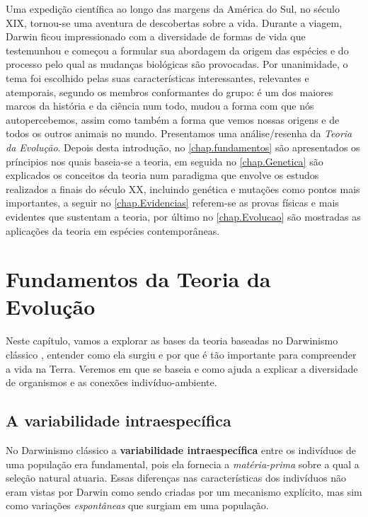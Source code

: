 \documentclass{report}
\begin{document}
Uma expedição científica ao longo das margens da América do Sul, no século XIX, tornou-se uma aventura de descobertas sobre a vida. Durante a viagem, Darwin ficou impressionado com a diversidade de formas de vida que testemunhou e começou a formular sua abordagem da origem das espécies e do processo pelo qual as mudanças biológicas são provocadas.
Por unanimidade, o tema foi escolhido pelas suas características interessantes, relevantes e atemporais, segundo os membros conformantes do grupo: é um dos maiores marcos da história e da ciência num todo, mudou a forma com que nós autopercebemos, assim como também a forma que vemos nossas origens e de todos os outros animais no mundo. 
Presentamos uma análise/resenha da \textit{Teoria da Evolução}. Depois desta introdução, no \autoref{chap.fundamentos} são apresentados os príncipios nos quais baseia-se a teoria, em seguida no \autoref{chap.Genetica} são explicados os conceitos da teoria num paradigma que envolve os estudos realizados a finais do século XX, incluindo genética e mutações como pontos mais importantes, a seguir no \autoref{chap.Evidencias} referem-se as provas físicas e mais evidentes que sustentam a teoria, por último no \autoref{chap.Evolucao} são mostradas as aplicações da teoria em espécies contemporâneas. 

\chapter{Fundamentos da Teoria da Evolução}\label{chap.fundamentos}

Neste capítulo, vamos a explorar as bases da teoria baseadas no Darwinismo clássico \cite{darwin.origin.2008}, entender como ela surgiu e por que é tão importante para compreender a vida na Terra. Veremos em que se baseia e como ajuda a explicar a diversidade de organismos e as conexões indivíduo-ambiente.

\section{A variabilidade intraespecífica}\label{sec.variacao}

No Darwinismo clássico a \textbf{variabilidade intraespecífica} entre os indivíduos de uma população era fundamental, pois ela fornecia a \textit{matéria-prima} sobre a qual a seleção natural atuaria. Essas diferenças nas características dos indivíduos não eram vistas por Darwin como sendo criadas por um mecanismo explícito, mas sim como variações \textit{espontâneas} que surgiam em uma população. 
\end{document}

